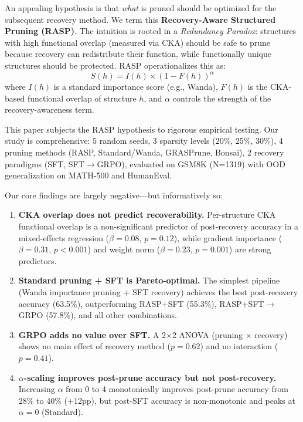 \documentclass[11pt,a4paper]{article}
\begin{document}
An appealing hypothesis is that \emph{what} is pruned should be optimized for the subsequent recovery method. We term this \textbf{Recovery-Aware Structured Pruning (RASP)}. The intuition is rooted in a \emph{Redundancy Paradox}: structures with high functional overlap (measured via CKA) should be safe to prune because recovery can redistribute their function, while functionally unique structures should be protected. RASP operationalizes this as:
\begin{equation}
    S(h) = I(h) \times (1 - F(h))^\alpha
\label{eq:rasp}
\end{equation}
where $I(h)$ is a standard importance score (e.g., Wanda), $F(h)$ is the CKA-based functional overlap of structure $h$, and $\alpha$ controls the strength of the recovery-awareness term.

This paper subjects the RASP hypothesis to rigorous empirical testing. Our study is comprehensive: 5 random seeds, 3 sparsity levels (20\%, 25\%, 30\%), 4 pruning methods (RASP, Standard/Wanda, GRASPrune, Bonsai), 2 recovery paradigms (SFT, SFT$\to$GRPO), evaluated on GSM8K (N=1319) with OOD generalization on MATH-500 and HumanEval.

Our core findings are largely negative---but informatively so:
\begin{enumerate}
    \item \textbf{CKA overlap does not predict recoverability.} Per-structure CKA functional overlap is a non-significant predictor of post-recovery accuracy in a mixed-effects regression ($\beta{=}0.08$, $p{=}0.12$), while gradient importance ($\beta{=}0.31$, $p{<}0.001$) and weight norm ($\beta{=}0.23$, $p{=}0.001$) are strong predictors.
    \item \textbf{Standard pruning + SFT is Pareto-optimal.} The simplest pipeline (Wanda importance pruning + SFT recovery) achieves the best post-recovery accuracy (63.5\%), outperforming RASP+SFT (55.3\%), RASP+SFT$\to$GRPO (57.8\%), and all other combinations.
    \item \textbf{GRPO adds no value over SFT.} A 2$\times$2 ANOVA (pruning $\times$ recovery) shows no main effect of recovery method ($p{=}0.62$) and no interaction ($p{=}0.41$).
    \item \textbf{$\alpha$-scaling improves post-prune accuracy but not post-recovery.} Increasing $\alpha$ from 0 to 4 monotonically improves post-prune accuracy from 28\% to 40\% (+12pp), but post-SFT accuracy is non-monotonic and peaks at $\alpha{=}0$ (Standard).
\end{enumerate}
\end{document}
